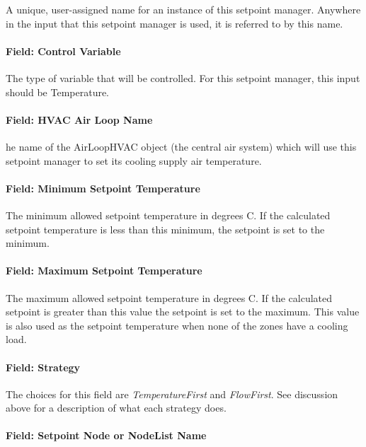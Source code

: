 A unique, user-assigned name for an instance of this setpoint manager. Anywhere in the input that this setpoint manager is used, it is referred to by this name.

\paragraph{Field: Control Variable}\label{field-control-variable-13}

The type of variable that will be controlled. For this setpoint manager, this input should be Temperature.

\paragraph{Field: HVAC Air Loop Name}\label{field-hvac-air-loop-name-3}

he name of the AirLoopHVAC object (the central air system) which will use this setpoint manager to set its cooling supply air temperature.

\paragraph{Field: Minimum Setpoint Temperature}\label{field-minimum-setpoint-temperature-3}

The minimum allowed setpoint temperature in degrees C. If the calculated setpoint temperature is less than this minimum, the setpoint is set to the minimum.

\paragraph{Field: Maximum Setpoint Temperature}\label{field-maximum-setpoint-temperature-3}

The maximum allowed setpoint temperature in degrees C. If the calculated setpoint is greater than this value the setpoint is set to the maximum. This value is also used as the setpoint temperature when none of the zones have a cooling load.

\paragraph{Field: Strategy}\label{field-strategy-2}

The choices for this field are \emph{TemperatureFirst} and \emph{FlowFirst}. See discussion above for a description of what each strategy does.

\paragraph{Field: Setpoint Node or NodeList Name}\label{field-setpoint-node-or-nodelist-name-12}

